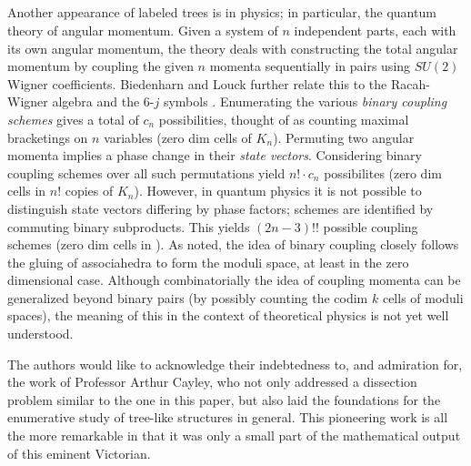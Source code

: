 \documentclass[10pt]{amsart}
\begin{document}
\subsection{}
Another appearance of labeled trees is in physics; in particular, the quantum theory of angular momentum. Given a system of $n$ independent parts, each with its own angular momentum, the theory deals with constructing the total angular momentum by coupling the given $n$ momenta sequentially in pairs using $SU(2)$ Wigner coefficients. Biedenharn and Louck further relate this to the Racah-Wigner algebra and the 6-$j$ symbols \cite[\S5]{racah}. Enumerating the various {\em binary coupling schemes} gives a total of $c_n$ possibilities, thought of as counting maximal bracketings on $n$ variables (zero dim cells of $K_n$). Permuting two angular momenta implies a phase change in their {\em state vectors}.  Considering  binary coupling schemes over all such permutations  yield $n! \cdot c_n$ possibilites (zero dim cells in $n!$ copies of $K_n$).  However, in quantum physics it is not possible to distinguish state vectors differing by phase factors; schemes are identified by commuting binary subproducts. This yields $(2n-3)!!$ possible coupling schemes (zero dim cells in ).  As noted, the idea of binary coupling closely follows the gluing of associahedra to form the moduli space, at least in the zero dimensional case.  Although combinatorially the idea of coupling momenta can be generalized beyond binary pairs (by possibly counting the codim $k$ cells of moduli spaces), the meaning of this in the context of theoretical physics is not yet well understood.


\vspace{.5in}

{\small
\begin{ack}
The authors would like to acknowledge their indebtedness to, and admiration for, the work of Professor Arthur Cayley, who not only addressed a dissection problem similar to the one in this paper, but also laid the foundations for the enumerative study of tree-like structures in general.   This pioneering work is all the more remarkable in that it was only a small part of the mathematical output of this eminent Victorian.
\end{ack}}

%
%
\end{document}
